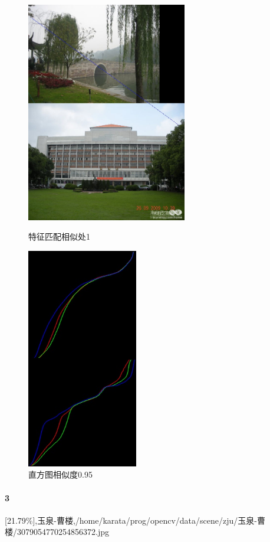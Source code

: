 \begin{figure}[htb]
\begin{minipage}[t]{0.5\linewidth}
\centering
\includegraphics[height=3.8in]{西泠.jpg.d/im2sift.jpg}
\caption{特征匹配相似处1}
\label{fig:side:a}
\end{minipage}%
\begin{minipage}[t]{0.5\linewidth}
\centering
\includegraphics[height=3.8in]{西泠.jpg.d/im2hist2.jpg}
\caption{直方图相似度0.95}
\label{fig:side:a}
\end{minipage}%
\end{figure}

\paragraph{3}
[21.79\%],玉泉-曹楼,/home/karata/prog/opencv/data/scene/zju/玉泉-曹楼/3079054770254856372.jpg

